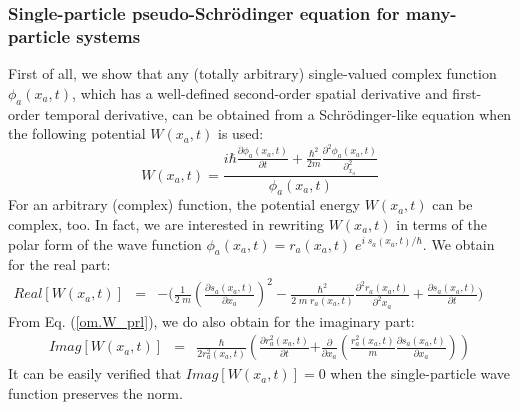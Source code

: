 \documentclass[onecolumn,nofootinbib, secnumarabic, amsmath, nobibnotes,12pt,aps,pra]{revtex4-1}
\newcommand{\eref}[1]{Eq. (\ref{#1})}
\begin{document}
\subsubsection{Single-particle pseudo-Schr\"odinger equation for many-particle systems}

First of all, we show that any (totally arbitrary) single-valued complex function $\phi_a(x_a,t)$, which has a well-defined second-order spatial derivative and first-order temporal derivative, can be obtained from a Schr\"odinger-like equation when the following potential $W(x_{a},t)$ is used:\vspace*{-6pt}
\begin{equation}
\label{om.W_prl}
W(x_{a},t) = \frac {i\hbar\frac{\partial \phi_{a}(x_{a},t)}{\partial t} + \frac{\hbar^2}{2m}\frac{\partial^2\phi_{a}(x_{a},t) }{\partial_{x_a}^2}} {\phi_{a}(x_{a},t)}
\end{equation}
For an arbitrary (complex) function, the potential energy
$W(x_{a},t)$ can be complex, too. In fact, we are interested in rewriting  $W(x_{a},t)$ in terms of the polar form of the wave
function $\phi_a(x_a,t) = r_a(x_a,t) \; e^{i \; s_a(x_a,t)/\hbar}$.
We obtain for the real part:
\begin{eqnarray}
\label{om.ReW_prl}
{Real}[W(x_{a},t)] &=& - \Bigg( \frac {1} {2 \; m} \left (\frac {\partial s_a(x_a,t)} {\partial x_a} \right)^2-\frac{\hbar^2} {2 \; m \; r_a(x_a,t)}
\frac {\partial^2 r_a(x_a,t)} {\partial^2 x_a}
 + \frac {\partial s_a(x_a,t)} {\partial t} \Bigg)\qquad
\end{eqnarray}
From \eref{om.W_prl}, we do also obtain  for the imaginary part:
\begin{eqnarray}
\label{om.ImW_prl}
\textit{Imag}[W(x_{a},t)] &=& \frac{\hbar}
{2r_a^2(x_a,t)}\!\! \left( \frac {\partial r_a^2(x_a,t)} {\partial
t}\right.\left. + \frac {\partial} {\partial x_a} \left( \frac {r_a^2(x_a,t)} {m}
\frac {\partial s_a(x_a,t)} {\partial x_a} \right) \right)
\end{eqnarray}
It can be easily verified that $\textit{Imag}[W(x_{a},t)] = 0$ when the single-particle wave function preserves the norm.
\end{document}
